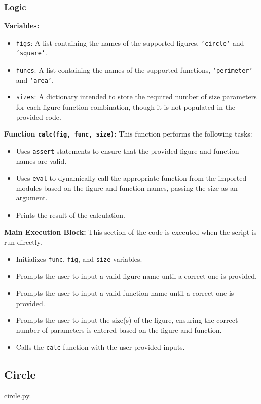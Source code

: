 \documentclass[12pt]{article}
\begin{document}
\subsubsection{Logic}
\textbf{Variables:}
\begin{itemize}
    \item \texttt{figs}: A list containing the names of the supported figures, \texttt{'circle'} and \texttt{'square'}.
    \item \texttt{funcs}: A list containing the names of the supported functions, \texttt{'perimeter'} and \texttt{'area'}.
    \item \texttt{sizes}: A dictionary intended to store the required number of size parameters for each figure-function combination, though it is not populated in the provided code.
\end{itemize}

\textbf{Function \texttt{calc(fig, func, size)}:} This function performs the following tasks:
\begin{itemize}
    \item Uses \texttt{assert} statements to ensure that the provided figure and function names are valid.
    \item Uses \texttt{eval} to dynamically call the appropriate function from the imported modules based on the figure and function names, passing the size as an argument.
    \item Prints the result of the calculation.
\end{itemize}

\textbf{Main Execution Block:} This section of the code is executed when the script is run directly.
\begin{itemize}
    \item Initializes \texttt{func}, \texttt{fig}, and \texttt{size} variables.
    \item Prompts the user to input a valid figure name until a correct one is provided.
    \item Prompts the user to input a valid function name until a correct one is provided.
    \item Prompts the user to input the size(s) of the figure, ensuring the correct number of parameters is entered based on the figure and function.
    \item Calls the \texttt{calc} function with the user-provided inputs.
\end{itemize}


\newpage

\subsection{Circle}
\href{https://github.com/niumandzi/geometric_lib/blob/docs/circle.py}{circle.py}.
\end{document}
